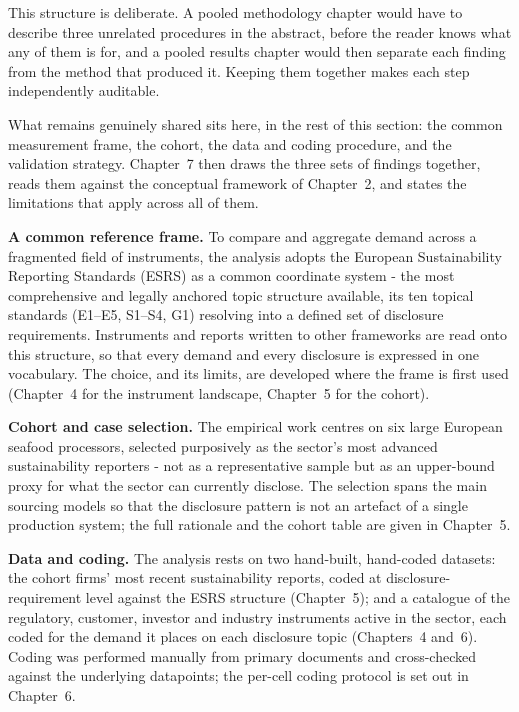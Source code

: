 \documentclass[
]{article}
\begin{document}
This structure is deliberate. A pooled methodology chapter would have to
describe three unrelated procedures in the abstract, before the reader knows what
any of them is for, and a pooled results chapter would then separate each finding
from the method that produced it. Keeping them together makes each step
independently auditable.

What remains genuinely shared sits here, in the rest of this section: the common
measurement frame, the cohort, the data and coding procedure, and the validation
strategy. Chapter~7 then draws the three sets of findings together, reads them
against the conceptual framework of Chapter~2, and states the limitations that
apply across all of them.

\textbf{A common reference frame.} To compare and aggregate demand across a
fragmented field of instruments, the analysis adopts the European Sustainability
Reporting Standards (ESRS) as a common coordinate system - the most comprehensive
and legally anchored topic structure available, its ten topical standards (E1--E5,
S1--S4, G1) resolving into a defined set of disclosure requirements. Instruments and
reports written to other frameworks are read onto this structure, so that every
demand and every disclosure is expressed in one vocabulary. The choice, and its
limits, are developed where the frame is first used (Chapter~4 for the instrument
landscape, Chapter~5 for the cohort).

\textbf{Cohort and case selection.} The empirical work centres on six large
European seafood processors, selected purposively as the sector's most advanced
sustainability reporters - not as a representative sample but as an upper-bound
proxy for what the sector can currently disclose. The selection spans the main
sourcing models so that the disclosure pattern is not an artefact of a single
production system; the full rationale and the cohort table are given in Chapter~5.

\textbf{Data and coding.} The analysis rests on two hand-built, hand-coded datasets:
the cohort firms' most recent sustainability reports, coded at
disclosure-requirement level against the ESRS structure (Chapter~5); and a catalogue
of the regulatory, customer, investor and industry instruments active in the sector,
each coded for the demand it places on each disclosure topic (Chapters~4 and~6).
Coding was performed manually from primary documents and cross-checked against the
underlying datapoints; the per-cell coding protocol is set out in Chapter~6.
\end{document}
